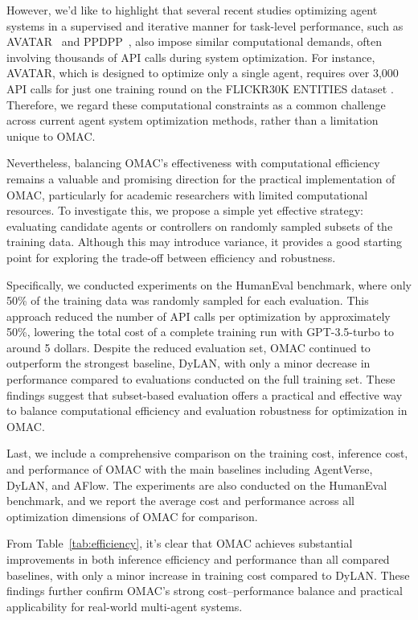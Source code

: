 However, we'd like to highlight that several recent studies optimizing agent systems in a supervised and iterative manner for task-level performance, such as AVATAR~\cite{wu2024avatar} and PPDPP~\cite{deng2023plug}, also impose similar computational demands, often involving thousands of API calls during system optimization. For instance, AVATAR, which is designed to optimize only a single agent, requires over 3,000 API calls for just one training round on the FLICKR30K ENTITIES dataset \cite{plummer2015flickr30k}. Therefore, we regard these computational constraints as a common challenge across current agent system optimization methods, rather than a limitation unique to OMAC.



Nevertheless, balancing OMAC's effectiveness with computational efficiency remains a valuable and promising direction for the practical implementation of OMAC, particularly for academic researchers with limited computational resources. To investigate this, we propose a simple yet effective strategy: evaluating candidate agents or controllers on randomly sampled subsets of the training data. Although this may introduce variance, it provides a good starting point for exploring the trade-off between efficiency and robustness.

Specifically, we conducted experiments on the HumanEval benchmark, where only 50\% of the training data was randomly sampled for each evaluation. This approach reduced the number of API calls per optimization by approximately 50\%, lowering the total cost of a complete training run with GPT-3.5-turbo to around 5 dollars. Despite the reduced evaluation set, OMAC continued to outperform the strongest baseline, DyLAN, with only a minor decrease in performance compared to evaluations conducted on the full training set. These findings suggest that subset-based evaluation offers a practical and effective way to balance computational efficiency and evaluation robustness for optimization in OMAC.




Last, we include a comprehensive comparison on the training cost, inference cost, and performance of OMAC with the main baselines including AgentVerse, DyLAN, and AFlow. The experiments are also conducted on the HumanEval benchmark, and we report the average cost and performance across all optimization dimensions of OMAC for comparison.



From Table~\ref{tab:efficiency}, it's clear that OMAC achieves substantial improvements in both inference efficiency and performance than all compared baselines, with only a minor increase in training cost compared to DyLAN. These findings further confirm OMAC’s strong cost–performance balance and practical applicability for real-world multi-agent systems.  



